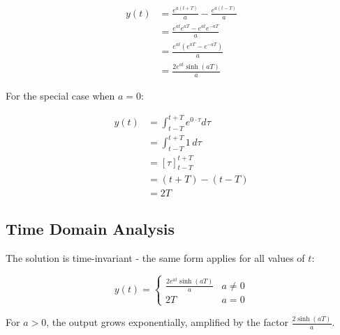 \documentclass[12pt,a4paper,titlepage]{article}
\begin{document}
\begin{align}
y(t) &= \frac{e^{a(t+T)}}{a} - \frac{e^{a(t-T)}}{a} \\
&= \frac{e^{at}e^{aT} - e^{at}e^{-aT}}{a} \\
&= \frac{e^{at}(e^{aT} - e^{-aT})}{a} \\
&= \frac{2e^{at}\sinh(aT)}{a}
\end{align}

For the special case when $a = 0$:

\begin{align}
y(t) &= \int_{t-T}^{t+T} e^{0\cdot\tau}d\tau \\
&= \int_{t-T}^{t+T} 1 \, d\tau \\
&= [{\tau}]_{t-T}^{t+T} \\
&= (t+T) - (t-T) \\
&= 2T
\end{align}

\subsection{Time Domain Analysis}
The solution is time-invariant - the same form applies for all values of $t$:

\begin{equation}
y(t) = 
\begin{cases}
\frac{2e^{at}\sinh(aT)}{a} & a \neq 0 \\
2T & a = 0
\end{cases}
\end{equation}

For $a > 0$, the output grows exponentially, amplified by the factor $\frac{2\sinh(aT)}{a}$.
\end{document}
